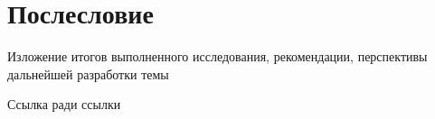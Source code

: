 \chapter*{Послесловие} %
\renewcommand{\leftmark}{Послесловие}

Изложение итогов выполненного исследования, рекомендации, перспективы дальнейшей разработки темы

Ссылка ради ссылки \cite{perov10glonass}

\renewcommand{\leftmark}{\oldleftmark}

